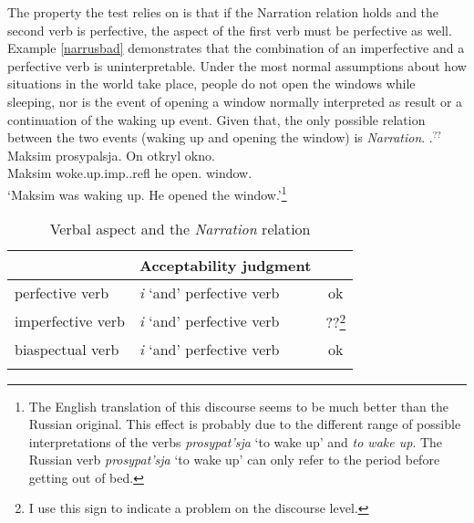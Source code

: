 The property the test relies on is that if the Narration relation  holds and the second verb is perfective, the aspect of the first verb must be perfective as well. Example \ref{narrusbad} demonstrates that the combination of an imperfective and a perfective verb  is uninterpretable. Under the most normal assumptions about how situations in the world take place, people do not open the windows while sleeping, nor is the event of opening a window normally interpreted as result or a continuation of the waking up event. Given that, the only possible relation between the two events (waking up and opening the window) is \textit{Narration}.
\exg.\label{narrusbad}$^{??}$Maksim prosypalsja\textsuperscript{\IPF}. On otkryl\textsuperscript{\PF} okno.\\
Maksim woke.up.imp..refl he open. window.\\
\trans{}`Maksim was waking up. He opened the window.'\footnote{The English translation of this discourse seems to be much better than the Russian original. This effect is probably due to the different range of possible interpretations of the verbs \textit{prosypat'sja} `to wake up' and \textit{to wake up}. The Russian verb \textit{prosypat'sja} `to wake up' can only refer to the period before getting out of bed.}

\begin{table}
\caption{\label{table}Verbal aspect and the \textit{Narration} relation}
\begin{tabular}{llc}
\lsptoprule
\multicolumn{2}{c}{Verbal combination}& Acceptability judgment\\\midrule
perfective verb \index{perfective aspect!perfective verb} & \textit{i} `and' perfective verb \index{perfective aspect!perfective verb}~ & ok\hphantom{\textsuperscript{\textit{a}}}\\
imperfective verb \index{imperfective aspect!imperfective verb} & \textit{i} `and' perfective verb \index{perfective aspect!perfective verb}~ & ??\footnote{I use this sign to indicate a problem on the discourse level.}\\
biaspectual verb \index{biaspectual verb} & \textit{i} `and' perfective verb \index{perfective aspect!perfective verb}~ & ok\hphantom{\textsuperscript{\textit{a}}}\\
\lspbottomrule
\end{tabular}
\end{table}

